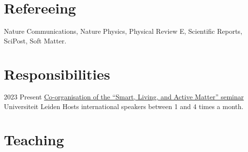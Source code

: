 \documentclass[a4paper]{cvtemplate_en} %
\begin{document}
\section{Refereeing}

Nature Communications, Nature Physics, Physical Review E,  Scientific Reports, SciPost, Soft Matter.
\vspace{25pt}


\section{Responsibilities}

\begin{cvbody}

\cvitem
	{2023}
	{Present}
	{\href{https://slam-leiden.nl}{Co-organisation of the ``Smart, Living, and Active Matter'' seminar}}
	{Universiteit Leiden }
	{}{}{}
    {}
	{Hosts international speakers between 1 and 4 times a month.\vspace{12.5pt}}

\end{cvbody}


\section{Teaching}
\end{document}
